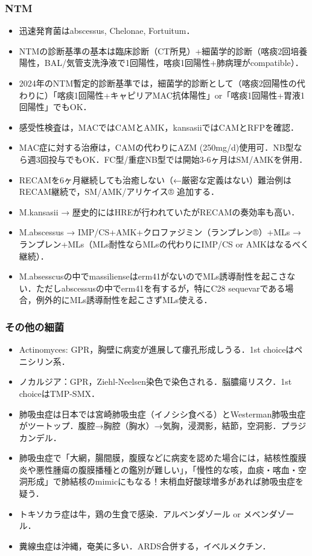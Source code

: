 \subsubsection{NTM}

\begin{itemize}
\item 迅速発育菌はabscessus, Chelonae, Fortuitum．
\item NTMの診断基準の基本は臨床診断（CT所見）+細菌学的診断（喀痰2回培養陽性，BAL/気管支洗浄液で1回陽性，喀痰1回陽性+肺病理がcompatible）．
\item 2024年のNTM暫定的診断基準では，細菌学的診断として（喀痰2回陽性の代わりに）「喀痰1回陽性+キャピリアMAC抗体陽性」or「喀痰1回陽性+胃液1回陽性」でもOK．
\item 感受性検査は，MACではCAMとAMK，kansasiiではCAMとRFPを確認．
\item MAC症に対する治療は，CAMの代わりにAZM (250mg/d)使用可．NB型なら週3回投与でもOK．FC型/重症NB型では開始3-6ヶ月はSM/AMKを併用．
\item RECAMを6ヶ月継続しても治癒しない（←厳密な定義はない）難治例はRECAM継続で，SM/AMK/アリケイス® 追加する．
\item M.kansasii → 歴史的にはHREが行われていたがRECAMの奏効率も高い．
\item M.abscessus → IMP/CS+AMK+クロファジミン（ランプレン®）+MLs → ランプレン+MLs（MLs耐性ならMLsの代わりにIMP/CS or AMKはなるべく継続）．
\item M.absesscusの中でmassilienseはerm41がないのでMLs誘導耐性を起こさない．ただしabscessusの中でerm41を有するが，特にC28 sequevarである場合，例外的にMLs誘導耐性を起こさずMLs使える．
\end{itemize}


\subsubsection{その他の細菌}

\begin{itemize}
\item Actinomyces: GPR，胸壁に病変が進展して瘻孔形成しうる．1st choiceはペニシリン系．
\item ノカルジア：GPR，Ziehl-Neelsen染色で染色される．脳膿瘍リスク．1st choiceはTMP-SMX．
\item 肺吸虫症は日本では宮崎肺吸虫症（イノシシ食べる）とWesterman肺吸虫症がツートップ．腹腔→胸腔（胸水）→気胸，浸潤影，結節，空洞影．プラジカンデル．
\item 肺吸虫症で「大網，腸間膜，腹膜などに病変を認めた場合には，結核性腹膜炎や悪性腫瘍の腹膜播種との鑑別が難しい」，「慢性的な咳，血痰・喀血・空洞形成」で肺結核のmimicにもなる！末梢血好酸球増多があれば肺吸虫症を疑う．
\item トキソカラ症は牛，鶏の生食で感染．アルベンダゾール or メベンダゾール．
\item 糞線虫症は沖縄，奄美に多い．ARDS合併する，イベルメクチン．
\end{itemize}


